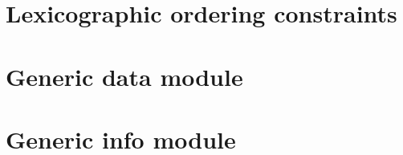\documentclass[fleqn]{report}
\begin{document}
\appendix
\chapter{Lexicographic ordering constraints}         \label{chap: lex}             \minitoc    
\chapter{Generic data module}                        \label{chap: generic data}    \minitoc    
\chapter{Generic info module}                        \label{chap: generic info}    \minitoc    

\nocite{*}

{\makeatletter\let\@mkboth\@gobbletwo\makeatother\printbibliography} %
\end{document}
